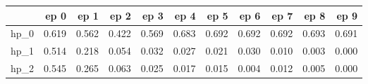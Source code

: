 \begin{tabular}{lrrrrrrrrrr}
\toprule
{} &   ep 0 &   ep 1 &   ep 2 &   ep 3 &   ep 4 &   ep 5 &   ep 6 &   ep 7 &   ep 8 &   ep 9 \\
\midrule
hp\_0 &  0.619 &  0.562 &  0.422 &  0.569 &  0.683 &  0.692 &  0.692 &  0.692 &  0.693 &  0.691 \\
hp\_1 &  0.514 &  0.218 &  0.054 &  0.032 &  0.027 &  0.021 &  0.030 &  0.010 &  0.003 &  0.000 \\
hp\_2 &  0.545 &  0.265 &  0.063 &  0.025 &  0.017 &  0.015 &  0.004 &  0.012 &  0.005 &  0.000 \\
\bottomrule
\end{tabular}
